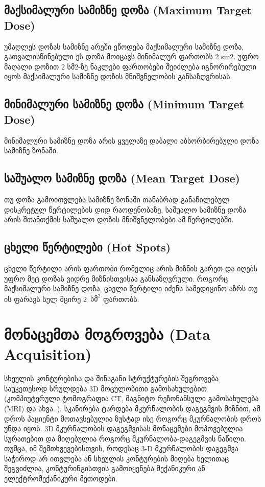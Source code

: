 \documentclass[12pt,a4paper,]{report}
\begin{document}
\section{მაქსიმალური სამიზნე დოზა (Maximum Target Dose)}
უმაღლეს დოზას სამიზნე არეში ეწოდება მაქსიმალური სამიზნე დოზა, გათვალისწინებული ეს დოზა მოიცავს მინიმალურ ფართობს 2 sm2. უფრო მაღალი დოზით 2 სმ2-ზე ნაკლები ფართობები შეიძლება იგნორირებული იყოს მაქსიმალური სამიზნე დოზის მნიშვნელობის განსაზღვრისას.

\section{მინიმალური სამიზნე დოზა (Minimum Target Dose)}
მინიმალური სამიზნე დოზა არის ყველაზე დაბალი აბსორბირებული დოზა სამიზნე ზონაში. 

\section{საშუალო სამიზნე დოზა (Mean Target Dose)}
თუ დოზა გამოითვლება სამიზნე ზონაში თანაბრად განაწილებულ დისკრეტულ წერტილების დიდ რაოდენობაზე, საშუალო სამიზნე დოზა არის შთანთქმის საშუალო დოზის მნიშვნელობები ამ წერტილებში. 

\section{ცხელი წერტილები (Hot Spots)}
ცხელი წერტილი არის ფართობი რომელიც არის მიზნის გარეთ და იღებს უფრო მეტ დოზას ვიდრე მიზნისთვისაა განსაზღვრული. როგორც მაქსიმალური სამიზნე დოზა, ცხელი წერტილი იძენს სამედიცინო აზრს თუ ის ფარავს სულ მცირე 2~$\text{სმ}^2$ ფართობს.

\chapter{მონაცემთა მოგროვება (Data Acquisition)}
სხეულის კონტურებისა და შინაგანი სტრუქტურების შეგროვება საუკეთესოდ სრულდება 3D მოცულობითი გამოსახულებით (კომპიუტერული ტომოგრაფია CT, მაგნიტო რეზონანსული გამოსახულება (MRI) და სხვა..). სკანირება ტარდება მკურნალობის დაგეგმვის მიზნით, ამ დროს პაციენტი მოთავსებულია ზუსტად ისე როგორც მკურნალობის დროს უნდა იყოს. 3D მკურნალობის დაგეგმვისას მონაცემები მოპოვებულია სურათებით და მიღებულია როგორც მკურნალობა-დაგეგმვის ნაწილი. თუმცა, იმ შემთხვევებისთვის, როდესაც 3-D მკურნალობის დაგეგმვა საჭიროდ არ ითვლება ან სხეულის კონტურების მიღება ხელითაც შეგვიძლია, კონტურინგისთვის გამოიყენება მექანიკური ან ელექტრომექანიკური მეთოდები.
\end{document}
